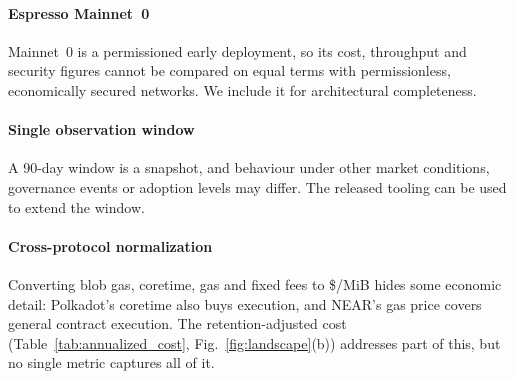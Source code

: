 \paragraph{Espresso Mainnet~0}
Mainnet~0 is a permissioned early deployment, so its cost, throughput and security figures cannot be compared on equal terms with permissionless, economically secured networks.
We include it for architectural completeness.

\paragraph{Single observation window}
A 90-day window is a snapshot, and behaviour under other market conditions, governance events or adoption levels may differ.
The released tooling can be used to extend the window.

\paragraph{Cross-protocol normalization}
Converting blob gas, coretime, gas and fixed fees to \$/MiB hides some economic detail: Polkadot's coretime also buys execution, and NEAR's gas price covers general contract execution.
The retention-adjusted cost (Table~\ref{tab:annualized_cost}, Fig.~\ref{fig:landscape}(b)) addresses part of this, but no single metric captures all of it.
